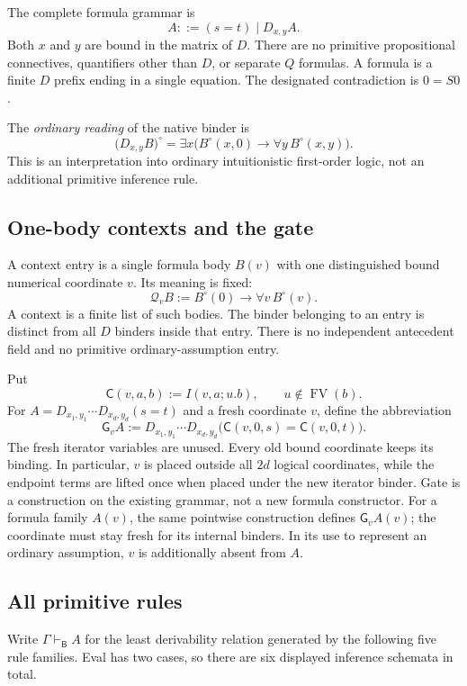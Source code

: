 \documentclass[11pt]{article}
\theoremstyle{definition}
\theoremstyle{remark}
\newcommand{\Bprf}{\mathsf{B}}
\newcommand{\sel}{\mathsf{C}}
\newcommand{\gate}{\mathsf{G}}
\newcommand{\FV}{\operatorname{FV}}
\newcommand{\entB}{\vdash_{\Bprf}}
\begin{document}
The complete formula grammar is
\[
 A ::= (s=t)\mid D_{x,y}A.
\]
Both $x$ and $y$ are bound in the matrix of $D$. There are no primitive
propositional connectives, quantifiers other than $D$, or separate $Q$
formulas. A formula is a finite $D$ prefix ending in a single equation.
The designated contradiction is $0=S0$.

The \emph{ordinary reading} of the native binder is
\[
 \bigl(D_{x,y}B\bigr)^\circ
 =\exists x\bigl(B^\circ(x,0)\to\forall y\,B^\circ(x,y)\bigr).
 \tag{D}
\]
This is an interpretation into ordinary intuitionistic first-order logic,
not an additional primitive inference rule.

\subsection{One-body contexts and the gate}

A context entry is a single formula body $B(v)$ with one distinguished
bound numerical coordinate $v$. Its meaning is fixed:
\[
 \mathcal Q_v B:=B^\circ(0)\to\forall v\,B^\circ(v).
 \tag{Context}
\]
A context is a finite list of such bodies. The binder belonging to an
entry is distinct from all $D$ binders inside that entry. There is no
independent antecedent field and no primitive ordinary-assumption entry.

Put
\[
 \sel(v,a,b):=I(v,a;u.b),\qquad u\notin\FV(b).
\]
For $A=D_{x_1,y_1}\cdots D_{x_d,y_d}(s=t)$ and a fresh coordinate $v$,
define the abbreviation
\[
 \gate_v A :=
 D_{x_1,y_1}\cdots D_{x_d,y_d}
 \bigl(\sel(v,0,s)=\sel(v,0,t)\bigr).
 \tag{Gate}
\]
The fresh iterator variables are unused. Every old bound coordinate keeps
its binding. In particular, $v$ is placed outside all $2d$ logical
coordinates, while the endpoint terms are lifted once when placed under
the new iterator binder. Gate is a construction on the existing grammar,
not a new formula constructor. For a formula family $A(v)$, the same
pointwise construction defines $\gate_v A(v)$; the coordinate must stay
fresh for its internal binders. In its use to represent an ordinary
assumption, $v$ is additionally absent from $A$.

\subsection{All primitive rules}

Write $\Gamma\entB A$ for the least derivability relation generated by
the following five rule families. Eval has two cases, so there are six
displayed inference schemata in total.
\end{document}
